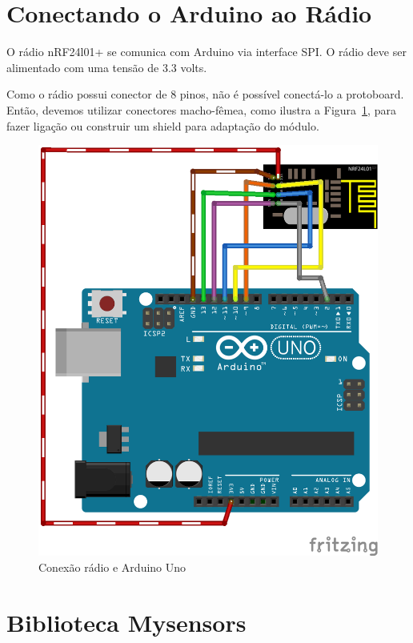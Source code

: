 
\section{Conectando o Arduino ao Rádio}

O rádio nRF24l01+ se comunica com Arduino via interface SPI. O rádio deve ser alimentado com uma tensão de 3.3 volts. 

Como o rádio possui conector de 8 pinos, não é possível conectá-lo a protoboard. Então, devemos utilizar conectores macho-fêmea, como ilustra a Figura~\ref{fig:gat}, para fazer ligação ou construir um shield para adaptação do módulo.

\begin{figure}[H]
      \centering
      \includegraphics[scale=0.50]{figuras/gateway.png}
      \caption{Conexão rádio e Arduino Uno}
      \label{fig:gat}
\end{figure}

\section{Biblioteca Mysensors}


